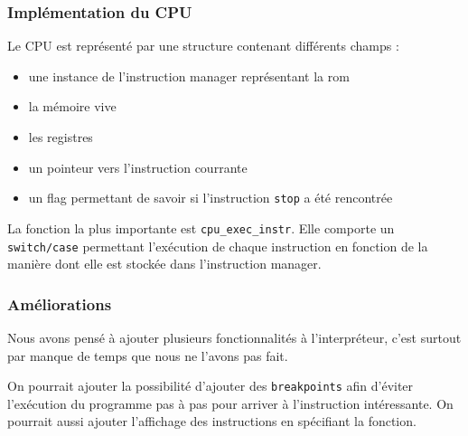     \subsubsection{Implémentation du CPU}

        Le CPU est représenté par une structure contenant différents champs :
        \begin{itemize}
            \item une instance de l'instruction manager représentant la rom
            \item la mémoire vive
            \item les registres
            \item un pointeur vers l'instruction courrante
            \item un flag permettant de savoir si l'instruction \texttt{stop} a été rencontrée
        \end{itemize}

        La fonction la plus importante est \texttt{cpu\_exec\_instr}. Elle comporte un \texttt{switch/case} permettant l'exécution de chaque instruction en fonction de la manière dont elle est stockée dans l'instruction manager. 

    \subsubsection{Améliorations}
    
        Nous avons pensé à ajouter plusieurs fonctionnalités à l'interpréteur, c'est surtout par manque de temps que nous ne l'avons pas fait.
        
        On pourrait ajouter la possibilité d'ajouter des \texttt{breakpoints} afin d'éviter l'exécution du programme pas à pas pour arriver à l'instruction intéressante. On pourrait aussi ajouter l'affichage des instructions en spécifiant la fonction. 
